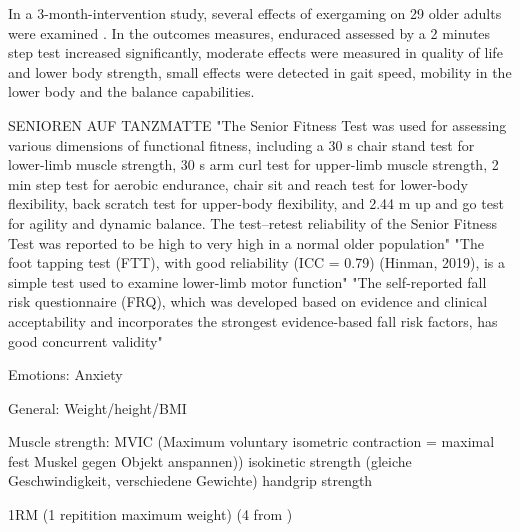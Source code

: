 In a 3-month-intervention study, several effects of exergaming on 29 older adults were examined \cite{neumann2018effects}. In the outcomes measures, enduraced assessed by a 2 minutes step test increased significantly, moderate effects were measured in quality of life and lower body strength, small effects were detected in gait speed, mobility in the lower body and the balance capabilities.

SENIOREN AUF TANZMATTE \cite{peng2020novel}
"The Senior Fitness Test was used for assessing various dimensions of functional fitness, including a 30 s chair stand test for lower-limb muscle strength, 30 s arm curl test for upper-limb muscle strength, 2 min step test for aerobic endurance, chair sit and reach test for lower-body flexibility, back scratch test for upper-body flexibility, and 2.44 m up and go test for agility and dynamic balance. The test–retest reliability of the Senior Fitness Test was reported to be high to very high in a normal older population"
"The foot tapping test (FTT), with good reliability (ICC = 0.79) (Hinman, 2019), is a simple test used to examine lower-limb motor function"
"The self-reported fall risk questionnaire (FRQ), which was developed based on evidence and clinical acceptability and incorporates the strongest evidence-based fall risk factors, has good concurrent validity"

Emotions:
Anxiety

General:
Weight/height/BMI

Muscle strength: MVIC (Maximum voluntary isometric contraction = maximal fest Muskel gegen Objekt anspannen))
isokinetic strength (gleiche Geschwindigkeit, verschiedene Gewichte)
handgrip strength

1RM (1 repitition maximum weight) (4 from \cite{viana2021effects})

